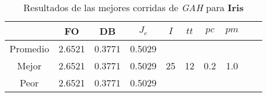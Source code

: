 \begin{table}[h!]
\footnotesize
\begin{center}
\begin{tabular}{|c|c|c|c|c|c|c|c|c|c|}
\hline
& {\bf FO} & {\bf DB}& $J_e$ & $I$ & $tt$ & $pc$ & $pm$ \\
\hline
\hline
Promedio   & 2.6521 & 0.3771  & 0.5029 &  &  &  & \\
\cline{1-4}
Mejor & 2.6521 & 0.3771  & 0.5029 & 25 & 12 & 0.2 & 1.0\\
\cline{1-4}
Peor & 2.6521 & 0.3771  & 0.5029 &  &  &  & \\\hline
\end{tabular}
\caption{Resultados de las mejores corridas de \emph{GAH} para {\bf Iris}}
\label{tb:pmpgahibcsv}
\end{center}
\end{table}
